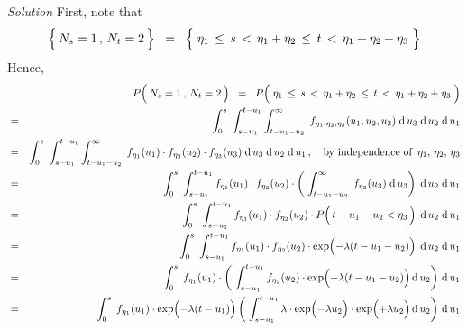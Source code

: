 \vskip 0.5cm
\noindent
\textit{Solution}\quad
First, note that
\begin{equation*}
\left\{\, N_{s} \overset{{\color{white}-}}{=} 1 \,,\, N_{t} = 2 \,\right\}
\;\; = \;\;
	\left\{\; \eta_{1} \,\leq\, s \,\overset{{\color{white}.}}{<}\, \eta_{1} + \eta_{2} \,\leq\, t \,<\, \eta_{1} + \eta_{2} + \eta_{3} \;\right\}
\end{equation*}
Hence,
\begin{eqnarray*}
&&
	P\!\left(\, N_{s} \overset{{\color{white}-}}{=} 1 \,,\, N_{t} = 2 \,\right)
\;\; = \;\;
	P\!\left(\; \eta_{1} \,\leq\, s \,\overset{{\color{white}.}}{<}\, \eta_{1} + \eta_{2} \,\leq\, t \,<\, \eta_{1} + \eta_{2} + \eta_{3} \;\right)
\\
& = &
	\int_{0}^{s}\; \int_{s-u_{1}}^{t-u_{1}} \int_{t-u_{1}-u_{2}}^{\infty}\;
	f_{\eta_{1},\eta_{2},\eta_{3}}(u_{1},u_{2},u_{3})
	\;\d\,u_{3}\;\d\,u_{2}\;\d\,u_{1}
\\
& = &
	\int_{0}^{s}\; \int_{s-u_{1}}^{t-u_{1}} \int_{t-u_{1}-u_{2}}^{\infty}\;
	f_{\eta_{1}}(u_{1}) \cdot f_{\eta_{2}}(u_{2}) \cdot f_{\eta_{3}}(u_{3})
	\;\d\,u_{3}\;\d\,u_{2}\;\d\,u_{1}\,,
	\quad
	\textnormal{by independence of \,$\eta_{1},\,\eta_{2},\,\eta_{3}$}
\\
& = &
	\int_{0}^{s}\; \int_{s-u_{1}}^{t-u_{1}}
		f_{\eta_{1}}(u_{1}) \cdot f_{\eta_{2}}(u_{2})
		\cdot
		\left(\;\int_{t-u_{1}-u_{2}}^{\infty}\; f_{\eta_{3}}(u_{3}) \;\d\,u_{3}\right)
		\;\d\,u_{2}\;\d\,u_{1}
\\
& = &
	\int_{0}^{s}\; \int_{s-u_{1}}^{t-u_{1}}
		f_{\eta_{1}}(u_{1}) \cdot f_{\eta_{2}}(u_{2})
		\cdot
		P\!\left(\,t\overset{{\color{white}.}}{-}u_{1}-u_{2}<\eta_{3}\,\right)
		\;\d\,u_{2}\;\d\,u_{1}
\\
& = &
	\int_{0}^{s}\; \int_{s-u_{1}}^{t-u_{1}}
		f_{\eta_{1}}(u_{1}) \cdot f_{\eta_{2}}(u_{2})
		\cdot
		\exp\!\left(\overset{{\color{white}.}}{-}\lambda(t-u_{1}-u_{2})\right)
		\;\d\,u_{2}\;\d\,u_{1}
\\
& = &
	\int_{0}^{s}\;
		f_{\eta_{1}}(u_{1}) \cdot 
		\left(\;\int_{s-u_{1}}^{t-u_{1}}
			f_{\eta_{2}}(u_{2})
			\cdot
			\exp\!\left(\overset{{\color{white}.}}{-}\lambda(t-u_{1}-u_{2})\right)
			\d\,u_{2}\right)
		\,\d\,u_{1}
\\
& = &
	\int_{0}^{s}\;
		f_{\eta_{1}}(u_{1}) \cdot \exp\!\left(\overset{{\color{white}.}}{-}\lambda(t-u_{1})\right)
		\left(\;\int_{s-u_{1}}^{t-u_{1}}
			\lambda\cdot\exp\!\left(\overset{{\color{white}.}}{-}\lambda u_{2}\right)
			\cdot
			\exp\!\left(\overset{{\color{white}.}}{+}\lambda u_{2}\right)
			\d\,u_{2}\right)
		\,\d\,u_{1}

\end{eqnarray*}
